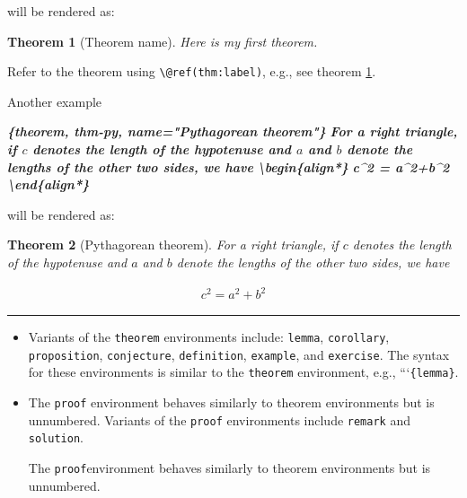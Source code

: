 \documentclass[
  a4paper,
  twoside,
  openright]{book}
\newenvironment{Shaded}{\begin{snugshade}}{\end{snugshade}}
\newcommand{\InformationTok}[1]{\textcolor[rgb]{0.56,0.35,0.01}{\textbf{\textit{#1}}}}
\newtheorem{theorem}{Theorem}[chapter]
\theoremstyle{definition}
\theoremstyle{definition}
\theoremstyle{definition}
\theoremstyle{definition}
\theoremstyle{remark}
\begin{document}
will be rendered as:

\begin{theorem}[Theorem name]
\protect\hypertarget{thm:label}{}\label{thm:label}Here is my first theorem.
\end{theorem}

Refer to the theorem using \texttt{\textbackslash{}@ref(thm:label)}, e.g., see theorem \ref{thm:label}.

Another example

\begin{Shaded}
\begin{Highlighting}[]
\InformationTok{\textasciigrave{}\textasciigrave{}\textasciigrave{}\{theorem, thm{-}py, name="Pythagorean theorem"\}}
\InformationTok{For a right triangle, if $c$ denotes the length of the hypotenuse and $a$ and $b$ denote the lengths of the other two sides, we have}
\InformationTok{  }
\InformationTok{  \textbackslash{}begin\{align*\}}
\InformationTok{  c\^{}2 = a\^{}2+b\^{}2}
\InformationTok{  \textbackslash{}end\{align*\}}
\InformationTok{\textasciigrave{}\textasciigrave{}\textasciigrave{}}
\end{Highlighting}
\end{Shaded}

will be rendered as:

\begin{theorem}[Pythagorean theorem]
\protect\hypertarget{thm:thm-py}{}\label{thm:thm-py}For a right triangle, if \(c\) denotes the length of the hypotenuse and \(a\) and \(b\) denote the lengths of the other two sides, we have

\begin{align*}
  c^2 = a^2+b^2
  \end{align*}
\end{theorem}

\begin{center}\rule{0.5\linewidth}{0.5pt}\end{center}

\begin{itemize}
\item
  Variants of the \texttt{theorem} environments include: \texttt{lemma}, \texttt{corollary}, \texttt{proposition}, \texttt{conjecture}, \texttt{definition}, \texttt{example}, and \texttt{exercise}. The syntax for these environments is similar to the \texttt{theorem} environment, e.g., ```\texttt{\{lemma\}}.
\item
  The \texttt{proof} environment behaves similarly to theorem environments but is unnumbered. Variants of the \texttt{proof} environments include \texttt{remark} and \texttt{solution}.

  The \texttt{proof}environment behaves similarly to theorem environments but is unnumbered.
\end{itemize}
\end{document}
